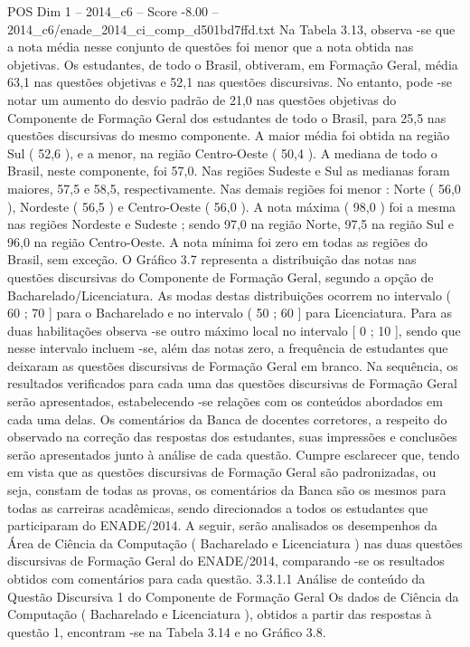 \begin{textsample}{POS Dim 1 – 2014\_c6 – Score -8.00 – 2014\_c6/enade\_2014\_ci\_comp\_d501bd7ffd.txt}
Na Tabela 3.13, observa -se que a nota média nesse conjunto de questões foi menor que a nota obtida nas objetivas.
Os estudantes, de todo o Brasil, obtiveram, em Formação Geral, média 63,1 nas questões objetivas e 52,1 nas questões discursivas.
No entanto, pode -se notar um aumento do desvio padrão de 21,0 nas questões objetivas do Componente de Formação Geral dos estudantes de todo o Brasil, para 25,5 nas questões discursivas do mesmo componente.
A maior média foi obtida na região Sul ( 52,6 ), e a menor, na região Centro-Oeste ( 50,4 ).
A mediana de todo o Brasil, neste componente, foi 57,0.
Nas regiões Sudeste e Sul as medianas foram maiores, 57,5 e 58,5, respectivamente.
Nas demais regiões foi menor : Norte ( 56,0 ), Nordeste ( 56,5 ) e Centro-Oeste ( 56,0 ).
A nota máxima ( 98,0 ) foi a mesma nas regiões Nordeste e Sudeste ; sendo 97,0 na região Norte, 97,5 na região Sul e 96,0 na região Centro-Oeste.
A nota mínima foi zero em todas as regiões do Brasil, sem exceção.
O Gráfico 3.7 representa a distribuição das notas nas questões discursivas do Componente de Formação Geral, segundo a opção de Bacharelado/Licenciatura.
As modas destas distribuições ocorrem no intervalo ( 60 ; 70 ] para o Bacharelado e no intervalo ( 50 ; 60 ] para Licenciatura.
Para as duas habilitações observa -se outro máximo local no intervalo [ 0 ; 10 ], sendo que nesse intervalo incluem -se, além das notas zero, a frequência de estudantes que deixaram as questões discursivas de Formação Geral em branco.
Na sequência, os resultados verificados para cada uma das questões discursivas de Formação Geral serão apresentados, estabelecendo -se relações com os conteúdos abordados em cada uma delas.
Os comentários da Banca de docentes corretores, a respeito do observado na correção das respostas dos estudantes, suas impressões e conclusões serão apresentados junto à análise de cada questão.
Cumpre esclarecer que, tendo em vista que as questões discursivas de Formação Geral são padronizadas, ou seja, constam de todas as provas, os comentários da Banca são os mesmos para todas as carreiras acadêmicas, sendo direcionados a todos os estudantes que participaram do ENADE/2014.
A seguir, serão analisados os desempenhos da Área de Ciência da Computação ( Bacharelado e Licenciatura ) nas duas questões discursivas de Formação Geral do ENADE/2014, comparando -se os resultados obtidos com comentários para cada questão. 3.3.1.1 Análise de conteúdo da Questão Discursiva 1 do Componente de Formação Geral Os dados de Ciência da Computação ( Bacharelado e Licenciatura ), obtidos a partir das respostas à questão 1, encontram -se na Tabela 3.14 e no Gráfico 3.8.

\end{textsample}
